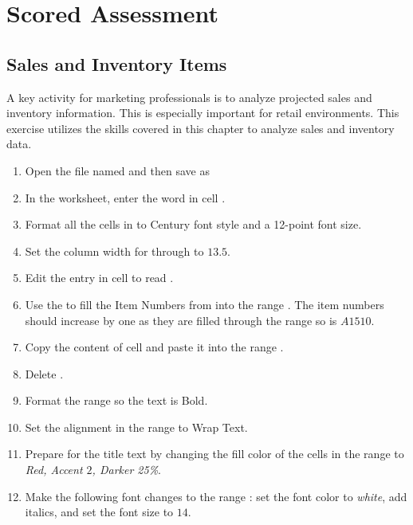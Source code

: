 \section{Scored Assessment}

\subsection{Sales and Inventory Items}

A key activity for marketing professionals is to analyze projected sales and inventory information. This is especially important for retail environments. This exercise utilizes the skills covered in this chapter to analyze sales and inventory data.

\begin{enumbox}
	\begin{enumerate}
		\item Open the file named  and then save as 
		\item In the  worksheet, enter the word  in cell .
		\item Format all the cells in  to Century font style and a 12-point font size.
		\item Set the column width for  through  to $ 13.5 $.
		\item Edit the entry in cell  to read .
		\item Use the  to fill the Item Numbers from  into the range . The item numbers should increase by one as they are filled through the range so  is $ A1510 $.
		\item Copy the content of cell  and paste it into the range .
		\item Delete .
		\item Format the range  so the text is Bold.
		\item Set the alignment in the range  to Wrap Text.
		\item Prepare  for the title text by changing the fill color of the cells in the range  to \textit{Red, Accent $ 2 $, Darker 25\%}.
		\item Make the following font changes to the range : set the font color to \textit{white}, add italics, and set the font size to $ 14 $.

\end{enumerate}
\end{enumbox}
